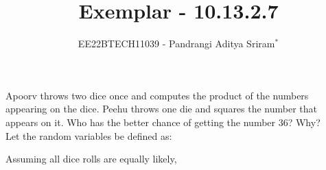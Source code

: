 \documentclass[journal,12pt,twocolumn]{IEEEtran}
\theoremstyle{remark}
\begin{document}

\vspace{3cm}

\title{Exemplar - 10.13.2.7}
\author{EE22BTECH11039 - Pandrangi Aditya Sriram$^{*}$%
}
\maketitle
\newpage
\bigskip

\renewcommand{\thefigure}{\theenumi}
\renewcommand{\thetable}{\theenumi}

Apoorv throws two dice once and computes the product of the numbers appearing
on the dice. Peehu throws one die and squares the number that appears on it. Who
has the better chance of getting the number 36? Why?\\\solution
Let the random variables be defined as:
\begin{table}[!ht]
	
\end{table}
Assuming all dice rolls are equally likely,
\end{document}
